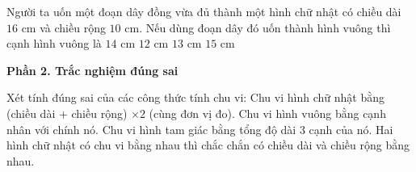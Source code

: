 \begin{ex} %
Người ta uốn một đoạn dây đồng vừa đủ thành một hình chữ nhật có chiều dài $16\text{ cm}$ và chiều rộng $10\text{ cm}$. Nếu dùng đoạn dây đó uốn thành hình vuông thì cạnh hình vuông là
\choice
{$14\text{ cm}$}
{$12\text{ cm}$}
{\True $13\text{ cm}$}
{$15\text{ cm}$}
\end{ex}

\textbf{Phần 2. Trắc nghiệm đúng sai}

\begin{ex} %
Xét tính đúng sai của các công thức tính chu vi:
\choiceTF
{\True Chu vi hình chữ nhật bằng (chiều dài + chiều rộng) $\times 2$ (cùng đơn vị đo).}
{Chu vi hình vuông bằng cạnh nhân với chính nó.}
{\True Chu vi hình tam giác bằng tổng độ dài 3 cạnh của nó.}
{Hai hình chữ nhật có chu vi bằng nhau thì chắc chắn có chiều dài và chiều rộng bằng nhau.}
\end{ex}

